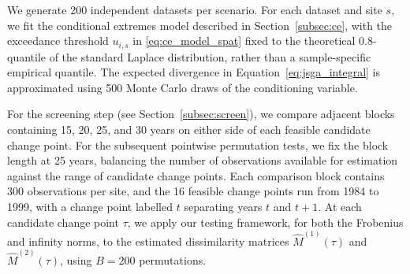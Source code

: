 \documentclass[APA,STIX1COL]{WileyNJD-v2}
\begin{document}
We generate 200 independent datasets per scenario. For each dataset and site $s$, we fit the conditional extremes model described in Section~\ref{subsec:ce}, with the exceedance threshold $u_{i,s}$ in \eqref{eq:ce_model_spat} fixed to the theoretical $0.8$-quantile of the standard Laplace distribution, rather than a sample-specific empirical quantile.
The expected divergence in Equation~\eqref{eq:jsga_integral} is approximated using 500 Monte Carlo draws of the conditioning variable.

For the screening step (see Section~\ref{subsec:screen}), we compare adjacent blocks containing 15, 20, 25, and 30 years on either side of each feasible candidate change point.
For the subsequent pointwise permutation tests, we fix the block length at 25 years, balancing the number of observations available for estimation against the range of candidate change points. 
Each comparison block contains 300 observations per site, and the 16 feasible change points run from 1984 to 1999, with a change point labelled $t$ separating years $t$ and $t+1$.
At each candidate change point $\tau$, we apply our testing framework, for both the Frobenius and infinity norms, to the estimated dissimilarity matrices $\widehat{M}^{(1)}(\tau)$ and $\widehat{M}^{(2)}(\tau)$, using $B=200$ permutations. 
\end{document}
